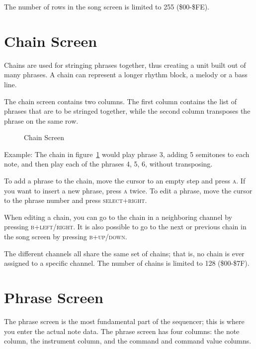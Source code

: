 The number of rows in the song screen is limited to 255 (\$00-\$FE).

\section{Chain Screen}
Chains are used for stringing phrases together, thus creating a unit built out of many
phrases. A chain can represent a longer rhythm block, a melody or a bass line.

The chain screen contains two columns. The first column contains the list of phrases that are
to be stringed together, while the second column transposes the phrase on the same row.

\begin{figure}[hbtp]
\centering
{}
\caption{Chain Screen}
\label{fig:chainexample}
\end{figure}

Example:
The chain in figure~\ref{fig:chainexample} would play phrase 3, adding 5 semitones to each note, and then play each of the phrases 4, 5, 6, without transposing.

To add a phrase to the chain, move the cursor to an empty step and press \textsc{a}. If you want to
insert a new phrase, press \textsc{a} twice. To edit a phrase, move the cursor to the phrase number
and press \textsc{select+right}.

When editing a chain, you can go to the chain in a neighboring channel by pressing \textsc{b+left/right}. It is also possible to go to the next or previous chain in the song screen by
pressing \textsc{b+up/down}.

The different channels all share the same set of chains; that is, no chain is ever assigned to a
specific channel. The number of chains is limited to 128 (\$00-\$7F).

\section{Phrase Screen}

\begin{figure}[hbtp]
\centering
{}
\end{figure}

The phrase screen is the most fundamental part of the sequencer; this is where you enter the actual note data. The phrase screen has four columns: the note column, the instrument column, and the command and command value columns.

